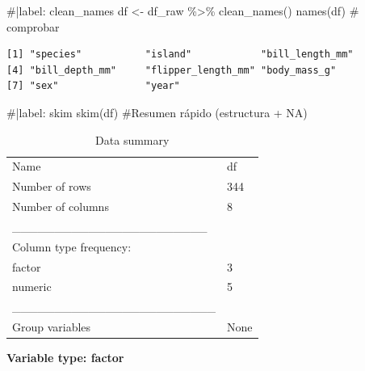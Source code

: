\documentclass[
  spanish,
  11pt,
  a4paper,
  DIV=11,
  numbers=noendperiod]{scrartcl}
\newenvironment{Shaded}{\begin{snugshade}}{\end{snugshade}}
\newcommand{\CommentTok}[1]{\textcolor[rgb]{0.37,0.37,0.37}{#1}}
\newcommand{\FunctionTok}[1]{\textcolor[rgb]{0.28,0.35,0.67}{#1}}
\newcommand{\NormalTok}[1]{\textcolor[rgb]{0.00,0.23,0.31}{#1}}
\newcommand{\OtherTok}[1]{\textcolor[rgb]{0.00,0.23,0.31}{#1}}
\newcommand{\SpecialCharTok}[1]{\textcolor[rgb]{0.37,0.37,0.37}{#1}}
\begin{document}
\begin{Shaded}
\begin{Highlighting}[numbers=left,,]
\CommentTok{\#|label: clean\_names}
\NormalTok{df }\OtherTok{\textless{}{-}}\NormalTok{ df\_raw }\SpecialCharTok{\%\textgreater{}\%} \FunctionTok{clean\_names}\NormalTok{()}
\FunctionTok{names}\NormalTok{(df) }\CommentTok{\# comprobar}
\end{Highlighting}
\end{Shaded}

\begin{verbatim}
[1] "species"           "island"            "bill_length_mm"   
[4] "bill_depth_mm"     "flipper_length_mm" "body_mass_g"      
[7] "sex"               "year"             
\end{verbatim}

\begin{Shaded}
\begin{Highlighting}[numbers=left,,]
\CommentTok{\#|label: skim}
\FunctionTok{skim}\NormalTok{(df) }\CommentTok{\#Resumen rápido (estructura + NA)}
\end{Highlighting}
\end{Shaded}

\begin{longtable}[]{@{}ll@{}}
\caption{Data summary}\tabularnewline
\toprule\noalign{}
\endfirsthead
\endhead
\bottomrule\noalign{}
\endlastfoot
Name & df \\
Number of rows & 344 \\
Number of columns & 8 \\
\_\_\_\_\_\_\_\_\_\_\_\_\_\_\_\_\_\_\_\_\_\_\_ & \\
Column type frequency: & \\
factor & 3 \\
numeric & 5 \\
\_\_\_\_\_\_\_\_\_\_\_\_\_\_\_\_\_\_\_\_\_\_\_\_ & \\
Group variables & None \\
\end{longtable}

\textbf{Variable type: factor}
\end{document}
